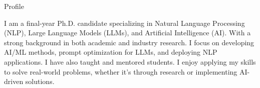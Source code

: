 


\begin{rubric}{Profile}
\begin{minipage}{\textwidth}
I am a final-year Ph.D. candidate specializing in Natural Language Processing (NLP), Large Language Models (LLMs), and Artificial Intelligence (AI). With a strong background in both academic and industry research. I focus on developing AI/ML methods, prompt optimization for LLMs, and deploying NLP applications. I have also taught and mentored students. I enjoy applying my skills to solve real-world problems, whether it's through research or implementing AI-driven solutions.
\end{minipage}
\end{rubric}